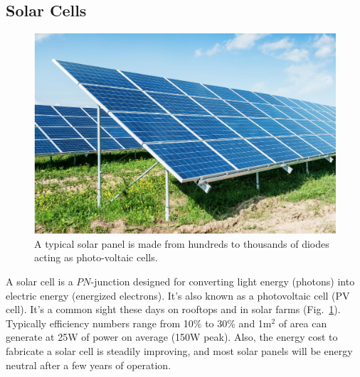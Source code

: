\subsection{Solar Cells}
\begin{figure}[tb]
\centering
\includegraphics[width=.5\columnwidth]{solar_cell.jpg}
\caption{A typical solar panel is made from hundreds to thousands of diodes acting as photo-voltaic cells.}
\label{fig:solar_cell}
\end{figure}
A solar cell is a $PN$-junction designed for converting light energy (photons) into electric energy (energized electrons).  It's also known as a photovoltaic cell (PV cell).  It's a common sight these days on rooftops and in solar farms (Fig.~\ref{fig:solar_cell}).   Typically efficiency numbers range from 10\% to 30\% and 1m$^2$ of area can generate at 25W of power on average (150W peak).  Also, the energy cost to fabricate a solar cell is steadily improving, and most solar panels will be energy neutral after a few years of operation.
